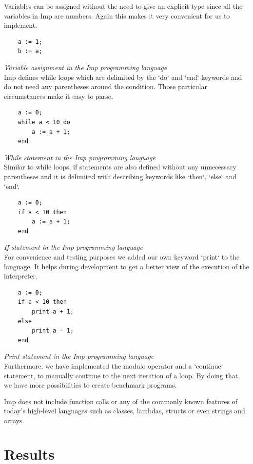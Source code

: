 \documentclass{article}
\begin{document}
Variables can be assigned without the need to give an explicit type since all
the variables in Imp are numbers. Again this makes it very convenient for us to
implement.

\begin{verbatim}
    a := 1;
    b := a;
\end{verbatim}
\textit{Variable assignment in the Imp programming language} \\

Imp defines while loops which are delimited by the `do` and `end` keywords and
do not need any parentheses around the condition. Those particular circumstances
make it easy to parse.

\begin{verbatim}
    a := 0;
    while a < 10 do
        a := a + 1;
    end
\end{verbatim}
\textit{While statement in the Imp programming language} \\

Similar to while loops, if statements are also defined without any unnecessary
parentheses and it is delimited with describing keywords like `then`, `else`
and `end`.

\begin{verbatim}
    a := 0;
    if a < 10 then
        a := a + 1;
    end
\end{verbatim}
\textit{If statement in the Imp programming language} \\

For convenience and testing purposes we added our own keyword `print` to the
language. It helps during development to get a better view of the execution
of the interpreter.

\begin{verbatim}
    a := 0;
    if a < 10 then
        print a + 1;
    else
        print a - 1;
    end
\end{verbatim}
\textit{Print statement in the Imp programming language} \\

Furthermore, we have implemented the modulo operator and a `continue` statement,
to manually continue to the next iteration of a loop. By doing that, we have
more possibilities to create benchmark programs.

Imp does not include function calls or any of the commonly known features of
today's high-level languages such as classes, lambdas, structs or even strings
and arrays.

\section{Results}
\end{document}
